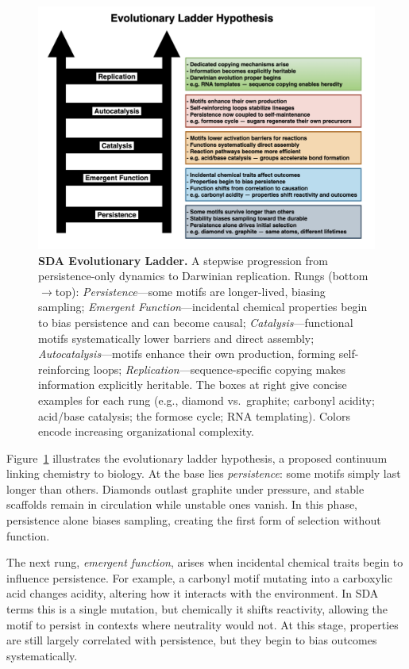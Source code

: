 \documentclass[life,article,submit,pdftex,moreauthors]{Definitions/mdpi}
\begin{document}
\begin{figure}[H]
\centering
\includegraphics[width=\textwidth]{SDA-ladder.png}
\caption{\textbf{SDA Evolutionary Ladder.} A stepwise progression from persistence-only dynamics to Darwinian replication. 
Rungs (bottom$\rightarrow$top): \emph{Persistence}—some motifs are longer-lived, biasing sampling; 
\emph{Emergent Function}—incidental chemical properties begin to bias persistence and can become causal; 
\emph{Catalysis}—functional motifs systematically lower barriers and direct assembly; 
\emph{Autocatalysis}—motifs enhance their own production, forming self-reinforcing loops; 
\emph{Replication}—sequence-specific copying makes information explicitly heritable. 
The boxes at right give concise examples for each rung (e.g., diamond vs.\ graphite; carbonyl acidity; acid/base catalysis; the formose cycle; RNA templating). 
Colors encode increasing organizational complexity.}
\label{fig:sda-ladder}
\end{figure}

Figure~\ref{fig:sda-ladder} illustrates the evolutionary ladder hypothesis, a proposed continuum linking chemistry to biology. At the base lies \emph{persistence}: some motifs simply last longer than others. Diamonds outlast graphite under pressure, and stable scaffolds remain in circulation while unstable ones vanish. In this phase, persistence alone biases sampling, creating the first form of selection without function.  

The next rung, \emph{emergent function}, arises when incidental chemical traits begin to influence persistence. For example, a carbonyl motif mutating into a carboxylic acid changes acidity, altering how it interacts with the environment. In SDA terms this is a single mutation, but chemically it shifts reactivity, allowing the motif to persist in contexts where neutrality would not. At this stage, properties are still largely correlated with persistence, but they begin to bias outcomes systematically.  
\end{document}
